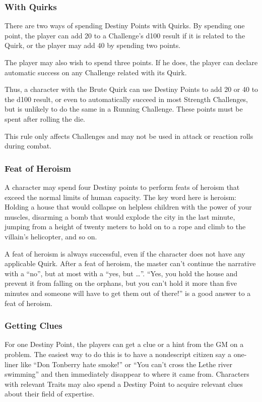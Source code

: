 \begin{multicols}{2}
\subsubsection{With Quirks}
There are two ways of spending Destiny Points with Quirks. By spending one point, the player can add 20 to a Challenge's d100 result if it is related to the Quirk, or the player may add 40 by spending two points.

The player may also wish to spend three points. If he does, the player can declare automatic success on any Challenge related with its Quirk.

Thus, a character with the Brute Quirk can use Destiny Points to add 20 or 40 to the d100 result, or even to automatically succeed in most Strength Challenges, but is unlikely to do the same in a Running Challenge. These points must be spent after rolling the die.

This rule only affects Challenges and may not be used in attack or reaction rolls during combat.

\subsubsection{Feat of Heroism}
A character may spend four Destiny points to perform feats of heroism that exceed the normal limits of human capacity. The key word here is heroism: Holding a house that would collapse on helpless children with the power of your muscles, disarming a bomb that would explode the city in the last minute, jumping from a height of twenty meters to hold on to a rope and climb to the villain’s helicopter, and so on.

A feat of heroism is always successful, even if the character does not have any applicable Quirk. After a feat of heroism, the master can’t continue the narrative with a ``no'', but at most with a ``yes, but \ldots''. ``Yes, you hold the house and prevent it from falling on the orphans, but you can’t hold it more than five minutes and someone will have to get them out of there!'' is a good answer to a feat of heroism.

\subsubsection{Getting Clues}
For one Destiny Point, the players can get a clue or a hint from the GM on a problem. The easiest way to do this is to have a nondescript citizen say a one-liner like ``Don Tonberry hate smoke!'' or ``You can’t cross the Lethe river swimming'' and then immediately disappear to where it came from. Characters with relevant Traits may also spend a Destiny Point to acquire relevant clues about their field of expertise.


\end{multicols}
